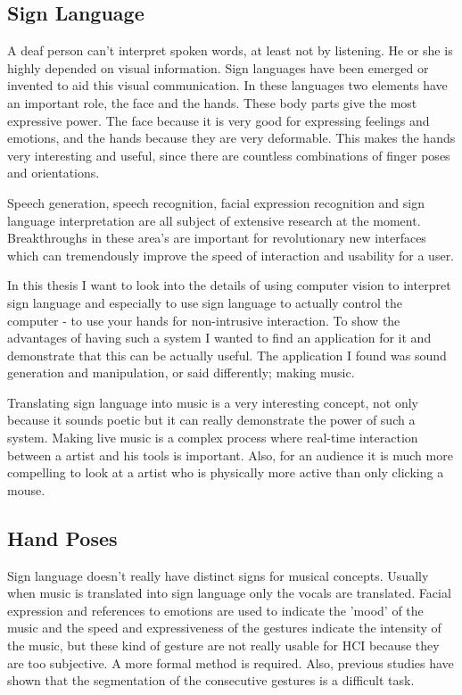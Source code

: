 \subsection*{Sign Language}

A deaf person can't interpret spoken words, at least not by listening. He or she is highly depended on visual information. Sign languages have been emerged or invented to aid this visual communication. In these languages two elements have an important role, the face and the hands. These body parts give the most expressive power. The face because it is very good for expressing feelings and emotions, and the hands because they are very deformable. This makes the hands very interesting and useful, since there are countless combinations of finger poses and orientations. 

Speech generation, speech recognition, facial expression recognition and sign language interpretation are all subject of extensive research at the moment. Breakthroughs in these area's are important for revolutionary new interfaces which can tremendously improve the speed of interaction and usability for a user. 

In this thesis I want to look into the details of using computer vision to interpret sign language and especially to use sign language to actually control the computer - to use your hands for non-intrusive interaction. To show the advantages of having such a system I wanted to find an application for it and demonstrate that this can be actually useful. The application I found was sound generation and manipulation, or said differently; making music. 

Translating sign language into music is a very interesting concept, not only because it sounds poetic but it can really demonstrate the power of such a system. Making live music is a complex process where real-time interaction between a artist and his tools is important. Also, for an audience it is much more compelling to look at a artist who is physically more active than only clicking a mouse.

\subsection*{Hand Poses}
Sign language doesn't really have distinct signs for musical concepts. Usually when music is translated into sign language only the vocals are translated. Facial expression and references to emotions are used to indicate the 'mood' of the music and the speed and expressiveness of the gestures indicate the intensity of the music, but these kind of gesture are not really usable for HCI because they are too subjective. A more formal method is required. Also, previous studies have shown that the segmentation of the consecutive gestures is a difficult task\cite{Buehler2009}.


